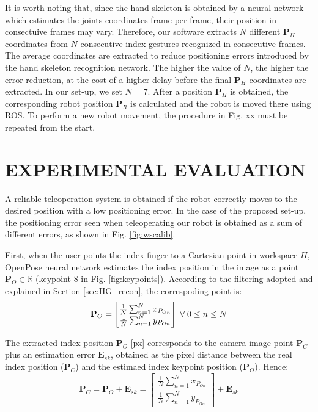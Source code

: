 \documentclass[letterpaper, 10 pt, conference]{ieeeconf}  %
\begin{document}
It is worth noting that, since the hand skeleton is obtained by a neural network which estimates the joints coordinates frame per frame, their position in consectuive frames may vary. Therefore, our software extracts $N$ different $\mathbf{P}_H$ coordinates from $N$ consecutive index gestures recognized in consecutive frames. The average coordinates are extracted to reduce positioning errors introduced by the hand skeleton recognition network. The higher the value of $N$, the higher the error reduction, at the cost of a higher delay before the final $\mathbf{P}_H$ coordinates are extracted. In our set-up, we set $N = 7$.
After a position $\mathbf{P}_H$ is obtained, the corresponding robot position $\mathbf{P}_R$ is calculated and the robot is moved there using ROS.
To perform a new robot movement, the procedure in Fig. xx must be repeated from the start. %

\section{EXPERIMENTAL EVALUATION}\label{sec:experiments}
A reliable teleoperation system is obtained if the robot correctly moves to the desired position with a low positioning error. In the case of the proposed set-up, the positioning error seen when teleoperating our robot is obtained as a sum of different errors, as shown in Fig. \ref{fig:wscalib}. %

First, when the user points the index finger to a Cartesian point in workspace $H$, OpenPose neural network estimates the index position in the image as a point $\mathbf{P}_O \in \mathbb{R}$ (keypoint $8$ in Fig. \ref{fig:keypoints}). According to the filtering adopted and explained in Section \ref{sec:HG_recon}, the correspoding point is:
\begin{equation}
\mathbf{P}_O = \begin{bmatrix}
\frac{1}{N}\sum_{n=1}^{N}x_{P_{On}} \\
\frac{1}{N}\sum_{n=1}^{N}y_{P_{On}}
\end{bmatrix}
\thickspace \forall\thickspace 0 \leq n \leq N
\end{equation}

The extracted index position $\mathbf{P}_O$ [px] corresponds to the camera image point $\mathbf{P}_C$ plus an estimation error $\mathbf{E}_{sk}$, obtained as the pixel distance between the real index position ($\mathbf{P}_C$) and the estimaed index keypoint position ($\mathbf{P}_O$). Hence: 
\begin{equation}
\mathbf{P}_C = \mathbf{P}_O + \mathbf{E}_{sk} = \begin{bmatrix}
\frac{1}{N}\sum_{n=1}^{N}x_{P_{On}} \\
\frac{1}{N}\sum_{n=1}^{N}y_{P_{On}}
\end{bmatrix} + \mathbf{E}_{sk}
\end{equation}
\end{document}
